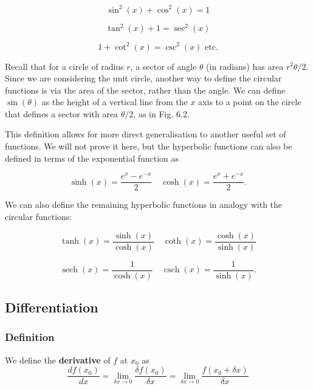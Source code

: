 \documentclass[11pt,titlepage]{article}
\numberwithin{equation}{section}
\begin{document}
\begin{equation}
\sin^{2}(x)+\cos^{2}(x)=1
\end{equation}

\begin{equation}
\tan^{2}(x)+1=\sec^{2}(x)
\end{equation}

\begin{equation}
1+\cot^{2}(x)=\csc^{2}(x) \text{ etc.}
\end{equation}

Recall that for a circle of radius $r$, a sector of angle $\theta$ (in radians) has area $r^{2}\theta/2$. Since we are considering the unit circle, another way to define the circular functions is via the area of the sector, rather than the angle. We can define $\sin(\theta)$ as the height of a vertical line from the $x$ axis to a point on the circle that defines a sector with area $\theta/2$, as in Fig. 6.2.

This definition allows for more direct generalisation to another useful set of functions.
We will not prove it here, but the hyperbolic functions can also be defined in terms of the exponential function as

\begin{equation}
\sinh(x) = \frac{e^{x} - e^{-x}}{2} \quad \cosh(x) = \frac{e^{x} + e^{-x}}{2}.
\end{equation}

We can also define the remaining hyperbolic functions in analogy with the circular functions:

\begin{equation}
\tanh(x) = \frac{\sinh(x)}{\cosh(x)} \quad \coth(x) = \frac{\cosh(x)}{\sinh(x)}
\end{equation}

\begin{equation}
\operatorname{sech}(x) = \frac{1}{\cosh(x)} \quad \operatorname{csch}(x) = \frac{1}{\sinh(x)}.
\end{equation}

\subsection{Differentiation}
\subsubsection{Definition}
We define the \textbf{derivative} of $f$ at $x_0$ as 
\begin{equation}
    \frac{df(x_0)}{dx}=\lim_{\delta x\rightarrow 0}\frac{\delta f(x_0)}{\delta x}=\lim_{\delta x\rightarrow 0}\frac{f(x_0+\delta x)}{\delta x}
\end{equation}
\end{document}
